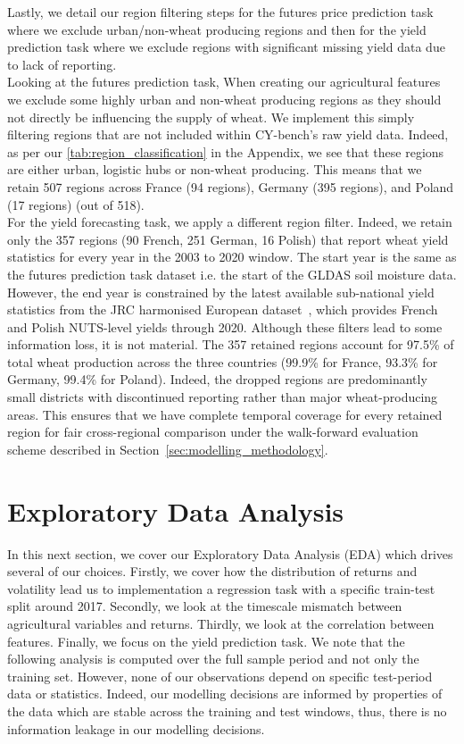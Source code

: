 \documentclass[pdflatex,sn-mathphys-num, oneside, 11pt]{sn-jnl}%
\theoremstyle{thmstyleone}%
\theoremstyle{thmstyletwo}%
\theoremstyle{thmstylethree}%
\begin{document}
Lastly, we detail our region filtering steps for the futures price prediction task where we exclude urban/non-wheat producing regions and then for the yield prediction task where we exclude regions with significant missing yield data due to lack of reporting.\\

Looking at the futures prediction task, When creating our agricultural features we exclude some highly urban and non-wheat producing regions as they should not directly be influencing the supply of wheat. We implement this simply filtering regions that are not included within CY-bench's raw yield data. Indeed, as per our \autoref{tab:region_classification} in the Appendix, we see that these regions are either urban, logistic hubs or non-wheat producing. This means that we retain 507 regions across France (94 regions), Germany (395 regions), and Poland (17 regions) (out of 518). \\

For the yield forecasting task, we apply a different region filter. Indeed, we retain only the 357 regions (90 French, 251 German, 16 Polish) that report wheat yield statistics for every year in the 2003 to 2020 window. The start year is the same as the futures prediction task dataset i.e. the start of the GLDAS soil moisture data. However, the end year is constrained by the latest available sub-national yield statistics from the JRC harmonised European dataset~\cite{bib_ronchetti2024}, which provides French and Polish NUTS-level yields through 2020. Although these filters lead to some information loss, it is not material. The 357 retained regions account for 97.5\% of total wheat production across the three countries (99.9\% for France, 93.3\% for Germany, 99.4\% for Poland). Indeed, the dropped regions are predominantly small districts with discontinued reporting rather than major wheat-producing areas. This ensures that we have complete temporal coverage for every retained region for fair cross-regional comparison under the walk-forward evaluation scheme described in Section~\ref{sec:modelling_methodology}.

\section{Exploratory Data Analysis}\label{sec:EDA}

In this next section, we cover our Exploratory Data Analysis (EDA) which drives several of our choices. Firstly, we cover how the distribution of returns and volatility lead us to implementation a regression task with a specific train-test split around 2017. Secondly, we look at the timescale mismatch between agricultural variables and returns. Thirdly, we look at the correlation between features. Finally, we focus on the yield prediction task. We note that the following analysis is computed over the full sample period and not only the training set. However, none of our observations depend on specific test-period data or statistics. Indeed, our modelling decisions are informed by properties of the data which are stable across the training and test windows, thus, there is no information leakage in our modelling decisions.
\end{document}
